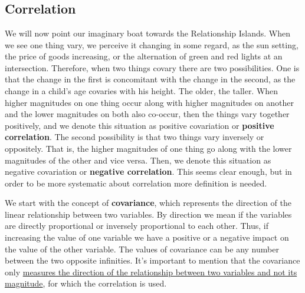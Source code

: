 \documentclass[
]{article}
\newenvironment{Shaded}{\begin{snugshade}}{\end{snugshade}}
\newcommand{\CommentTok}[1]{\textcolor[rgb]{0.56,0.35,0.01}{\textit{#1}}}
\newcommand{\FunctionTok}[1]{\textcolor[rgb]{0.13,0.29,0.53}{\textbf{#1}}}
\newcommand{\NormalTok}[1]{#1}
\newcommand{\SpecialCharTok}[1]{\textcolor[rgb]{0.81,0.36,0.00}{\textbf{#1}}}
\begin{document}
~

~

~

\hypertarget{correlation}{%
\subsection{Correlation}\label{correlation}}

We will now point our imaginary boat towards the Relationship Islands.
When we see one thing vary, we perceive it changing in some regard, as
the sun setting, the price of goods increasing, or the alternation of
green and red lights at an intersection. Therefore, when two things
covary there are two possibilities. One is that the change in the first
is concomitant with the change in the second, as the change in a child's
age covaries with his height. The older, the taller. When higher
magnitudes on one thing occur along with higher magnitudes on another
and the lower magnitudes on both also co-occur, then the things vary
together positively, and we denote this situation as positive
covariation or \textbf{positive correlation}. The second possibility is that
two things vary inversely or oppositely. That is, the higher magnitudes
of one thing go along with the lower magnitudes of the other and vice
versa. Then, we denote this situation as negative covariation or
\textbf{negative correlation}. This seems clear enough, but in order to be
more systematic about correlation more definition is needed.

We start with the concept of \textbf{covariance}, which represents the
direction of the linear relationship between two variables. By direction
we mean if the variables are directly proportional or inversely
proportional to each other. Thus, if increasing the value of one
variable we have a positive or a negative impact on the value of the
other variable. The values of covariance can be any number between the
two opposite infinities. It's important to mention that the covariance
only \ul{measures the direction of the relationship between two variables
and not its magnitude}, for which the correlation is used.

\begin{Shaded}
\end{Shaded}
\end{document}
